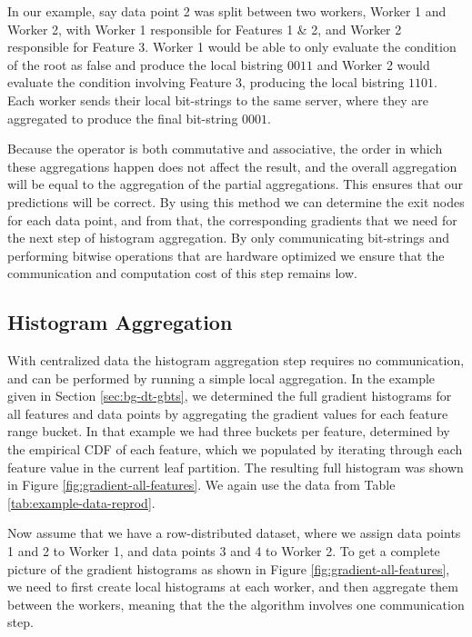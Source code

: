 In our example, say data point 2 was split between two workers, Worker 1 and Worker 2,
with Worker 1 responsible for Features 1 \& 2, and Worker 2 responsible for Feature 3.
Worker 1 would be able to only evaluate the condition of the root as false and produce
the local bistring $0011$ and Worker 2 would evaluate the condition involving Feature 3, producing
the local bistring $1101$. Each worker sends their local bit-strings to the same server,
where they are aggregated to produce the final bit-string $0001$.

Because the \AND operator is both commutative and associative, the order in which
these aggregations happen does not affect the result, and the overall aggregation
will be equal to the aggregation of the partial aggregations. This ensures that
our predictions will be correct. By using this method we can determine the exit
nodes for each data point, and from that, the corresponding gradients that we need
for the next step of histogram aggregation. By only communicating bit-strings
and performing bitwise operations that are hardware optimized we ensure that
the communication and computation cost of this step remains low.

\subsection{Histogram Aggregation}
\label{subsec:block-gbt-histogram-aggregation}


With centralized data the histogram aggregation step requires no communication,
and can be performed by running a simple local aggregation.
In the example given in Section \ref{sec:bg-dt-gbts}, we determined the full
gradient histograms for all features and data points by aggregating the
gradient values for each feature range bucket.
In that example we had three buckets per feature, determined by the empirical
CDF of each feature, which we populated by iterating through each feature
value in the current leaf partition. The resulting full histogram was
shown in Figure \ref{fig:gradient-all-features}. We  again use the
data from Table \ref{tab:example-data-reprod}.


Now assume that we have a row-distributed dataset, where we assign data points 1 and 2 to Worker 1, and data points 3 and 4 to
Worker 2.
To get a complete picture of the gradient histograms as shown in Figure \ref{fig:gradient-all-features}, we need to first create local histograms at each worker, and
then aggregate them between the workers, meaning that the the algorithm involves one communication
step.

